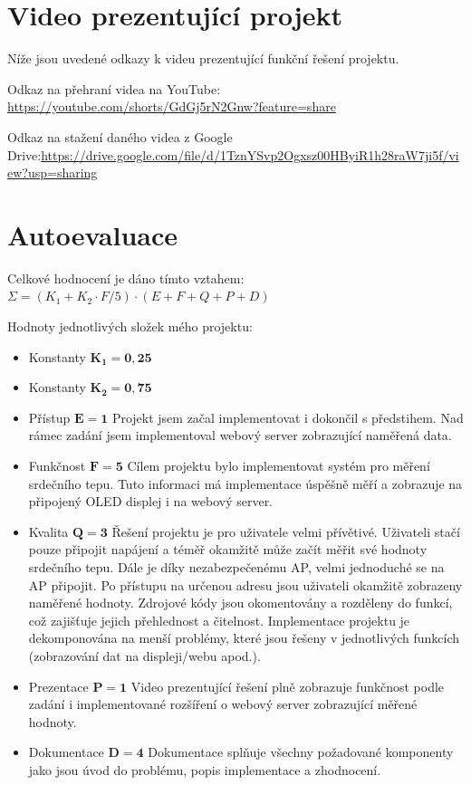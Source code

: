 \documentclass[12pt, a4paper]{article}
\begin{document}
    \newpage
    \section{Video prezentující projekt}
    Níže jsou uvedené odkazy k videu prezentující funkční řešení projektu.
    \newline

    Odkaz na přehraní videa na YouTube: \href{https://youtube.com/shorts/GdGj5rN2Gnw?feature=share}{https://youtube.com/shorts/GdGj5rN2Gnw?feature=share}



    Odkaz na stažení daného videa z Google Drive:\newline\href{https://drive.google.com/file/d/1TznYSvp2Ogxsz00HByiR1h28raW7ji5f/view?usp=sharing}{https://drive.google.com/file/d/1TznYSvp2Ogxsz00HByiR1h28raW7ji5f/view?usp=sharing}
    \section{Autoevaluace}
    Celkové hodnocení je dáno tímto vztahem: $\Sigma = (K_1 + K_2 \cdot F/5) \cdot (E + F + Q + P + D)$
    
    Hodnoty jednotlivých složek mého projektu:
    \begin{itemize}
        \item Konstanty $\bm{K_1 = 0,25}$
        \item Konstanty $\bm{K_2 = 0,75}$
        \item Přístup $\bm{E = 1}$\newline
        Projekt jsem začal implementovat i dokončil s předstihem. Nad rámec zadání jsem implementoval webový server zobrazující naměřená data.
        \item Funkčnost $\bm{F = 5}$\newline
        Cílem projektu bylo implementovat systém pro měření srdečního tepu. Tuto informaci má implementace úspěšně měří a zobrazuje na připojený OLED displej i na webový server.
        \item Kvalita $\bm{Q = 3}$\newline
        Řešení projektu je pro uživatele velmi přívětivé. Uživateli stačí pouze připojit napájení a téměř okamžitě může začít měřit své hodnoty srdečního tepu. Dále je díky nezabezpečenému AP, velmi jednoduché se na AP připojit. Po přístupu na určenou adresu jsou uživateli okamžitě zobrazeny naměřené hodnoty. Zdrojové kódy jsou okomentovány a rozděleny do funkcí, což zajišťuje jejich přehlednost a čitelnost. Implementace projektu je dekomponována na menší problémy, které jsou řešeny v jednotlivých funkcích (zobrazování dat na displeji/webu apod.).
        \item Prezentace $\bm{P = 1}$\newline
        Video prezentující řešení plně zobrazuje funkčnost podle zadání i implementované rozšíření o webový server zobrazující měřené hodnoty.
        \item Dokumentace $\bm{D = 4}$\newline
        Dokumentace splňuje všechny požadované komponenty jako jsou úvod do problému, popis implementace a zhodnocení.
    \end{itemize}
\end{document}
